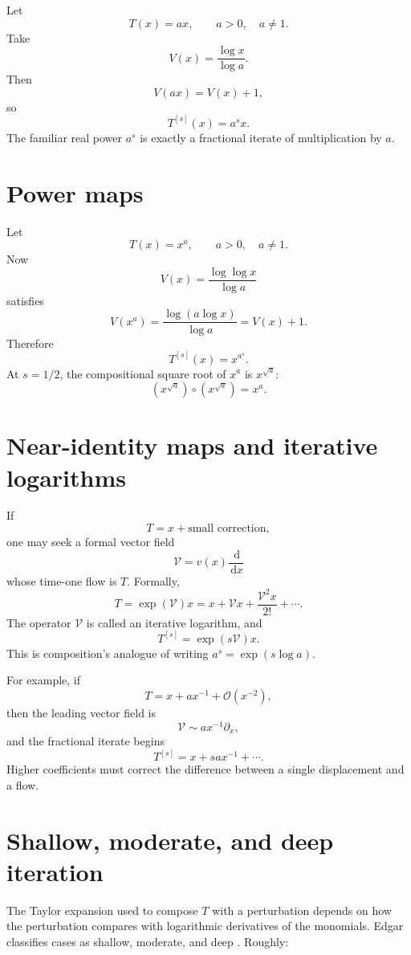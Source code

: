 \documentclass[11pt,openany]{book}
\theoremstyle{definition}
\theoremstyle{plain}
\theoremstyle{remark}
\newcommand{\dd}{\,\mathrm{d}}
\newcommand{\bigO}{\mathcal{O}}
\newcommand{\asym}{\sim}
\begin{document}
Let
\[
 T(x)=ax,
 \qquad a>0,\quad a\ne1.
\]
Take
\[
 V(x)=\frac{\log x}{\log a}.
\]
Then
\[
 V(ax)=V(x)+1,
\]
so
\begin{equation}\label{eq:fractional-scaling}
 T^{[s]}(x)=a^s x.
\end{equation}
The familiar real power $a^s$ is exactly a fractional iterate of multiplication by $a$.

\section{Power maps}

Let
\[
 T(x)=x^a,
 \qquad a>0,\quad a\ne1.
\]
Now
\[
 V(x)=\frac{\log\log x}{\log a}
\]
satisfies
\[
 V(x^a)=\frac{\log(a\log x)}{\log a}=V(x)+1.
\]
Therefore
\begin{equation}\label{eq:fractional-power-map}
 T^{[s]}(x)=x^{a^s}.
\end{equation}
At $s=1/2$, the compositional square root of $x^a$ is $x^{\sqrt a}$:
\[
 (x^{\sqrt a})\circ(x^{\sqrt a})=x^a.
\]

\section{Near-identity maps and iterative logarithms}

If
\[
 T=x+\text{small correction},
\]
one may seek a formal vector field
\[
 \mathcal{V}=v(x)\frac{\dd}{\dd x}
\]
whose time-one flow is $T$. Formally,
\begin{equation}\label{eq:flow-exp}
 T=\exp(\mathcal{V})x
 =x+\mathcal{V}x+\frac{\mathcal{V}^2x}{2!}+\cdots.
\end{equation}
The operator $\mathcal{V}$ is called an iterative logarithm, and
\[
 T^{[s]}=\exp(s\mathcal{V})x.
\]
This is composition's analogue of writing $a^s=\exp(s\log a)$.

For example, if
\[
 T=x+a x^{-1}+\bigO(x^{-2}),
\]
then the leading vector field is
\[
 \mathcal{V}\asym a x^{-1}\partial_x,
\]
and the fractional iterate begins
\[
 T^{[s]}=x+sax^{-1}+\cdots.
\]
Higher coefficients must correct the difference between a single displacement and a flow.

\section{Shallow, moderate, and deep iteration}

The Taylor expansion used to compose $T$ with a perturbation depends on how the perturbation compares with logarithmic derivatives of the monomials. Edgar classifies cases as shallow, moderate, and deep \cite{edgar-fractional}. Roughly:
\end{document}
